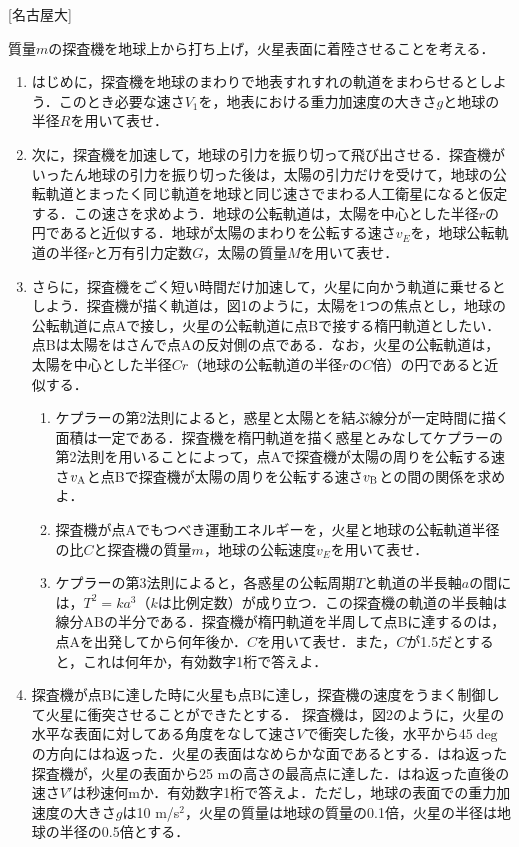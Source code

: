 



\noindent
{} [名古屋大]

質量$m$の探査機を地球上から打ち上げ，火星表面に着陸させることを考える．

\begin{enumerate}[label=\textbf{問\arabic*}]
  \item {\hzw}はじめに，探査機を地球のまわりで地表すれすれの軌道をまわらせるとしよう．このとき必要な速さ$V_1$を，地表における重力加速度の大きさ$g$と地球の半径$R$を用いて表せ．
  \item {\hzw}次に，探査機を加速して，地球の引力を振り切って飛び出させる．探査機がいったん地球の引力を振り切った後は，太陽の引力だけを受けて，地球の公転軌道とまったく同じ軌道を地球と同じ速さでまわる人工衛星になると仮定する．この速さを求めよう．地球の公転軌道は，太陽を中心とした半径$r$の円であると近似する．地球が太陽のまわりを公転する速さ$v_E$を，地球公転軌道の半径$r$と万有引力定数$G$，太陽の質量$M$を用いて表せ．
  \item {\hzw}さらに，探査機をごく短い時間だけ加速して，火星に向かう軌道に乗せるとしよう．探査機が描く軌道は，図1のように，太陽を1つの焦点とし，地球の公転軌道に点Aで接し，火星の公転軌道に点Bで接する楕円軌道としたい．点Bは太陽をはさんで点Aの反対側の点である．なお，火星の公転軌道は，太陽を中心とした半径$Cr$（地球の公転軌道の半径$r$の$C$倍）の円であると近似する．
  \begin{enumerate}[(1)]
    \item {\hzw}ケプラーの第2法則によると，惑星と太陽とを結ぶ線分が一定時間に描く面積は一定である．探査機を楕円軌道を描く惑星とみなしてケプラーの第2法則を用いることによって，点Aで探査機が太陽の周りを公転する速さ$v_\mathrm{A}$と点Bで探査機が太陽の周りを公転する速さ$v_\mathrm{B}$との間の関係を求めよ．
    \item {\hzw}探査機が点Aでもつべき運動エネルギーを，火星と地球の公転軌道半径の比$C$と探査機の質量$m$，地球の公転速度$v_E$を用いて表せ．
    \item {\hzw}ケプラーの第3法則によると，各惑星の公転周期$T$と軌道の半長軸$a$の間には，$T^2 = ka^3$（$k$は比例定数）が成り立つ．この探査機の軌道の半長軸は線分ABの半分である．探査機が楕円軌道を半周して点Bに達するのは，点Aを出発してから何年後か．$C$を用いて表せ．また，$C$が1.5だとすると，これは何年か，有効数字1桁で答えよ．
  \end{enumerate}
  \item {\hzw}探査機が点Bに達した時に火星も点Bに達し，探査機の速度をうまく制御して火星に衝突させることができたとする．
  {\hzw}探査機は，図2のように，火星の水平な表面に対してある角度をなして速さ$V$で衝突した後，水平から$45\deg$の方向にはね返った．火星の表面はなめらかな面であるとする．はね返った探査機が，火星の表面から25 mの高さの最高点に達した．はね返った直後の速さ$V'$は秒速何mか．有効数字1桁で答えよ．ただし，地球の表面での重力加速度の大きさ$g$は10 m/s${}^2$，火星の質量は地球の質量の0.1倍，火星の半径は地球の半径の0.5倍とする．
\end{enumerate}
